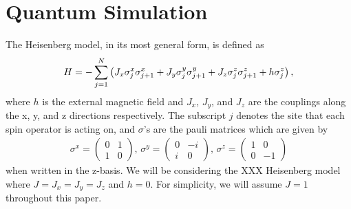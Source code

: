 \documentclass[aps,prl, reprint]{revtex4-2}
\begin{document}
\section{Quantum Simulation}

The Heisenberg model, in its most general form, is defined as
\begin{dmath}
H =- \sum_{j=1}^{N}\left(J_{x} \sigma_{j}^{x} \sigma_{j+1}^{x}+J_{y} \sigma_{j}^{y} \sigma_{j+1}^{y}\\
+J_{z} \sigma_{j}^{z} \sigma_{j+1}^{z}+h \sigma_{j}^{z}\right),
\end{dmath}
where $h$ is the external magnetic field and $J_x$, $J_y$, and $J_z$ are the couplings along the x, y, and z directions respectively. The subscript $j$ denotes the site that each spin operator is acting on, and $\sigma$'s are the pauli matrices which are given by 
\begin{equation}
\begin{array}{c}
\sigma^{x}=\left(\begin{array}{cc}
0 & 1 \\
1 & 0
\end{array}\right), \,
\sigma^{y}=\left(\begin{array}{cc}
0 & -i \\
i & 0
\end{array}\right),\,
\sigma^{z}=\left(\begin{array}{cc}
1 & 0 \\
0 & -1
\end{array}\right)
\end{array}
\end{equation}
when written in the z-basis. We will be considering the XXX Heisenberg model where $J = J_x = J_y = J_z$ and $h =0$. For simplicity, we will assume $J=1$ throughout this paper.  
\end{document}

